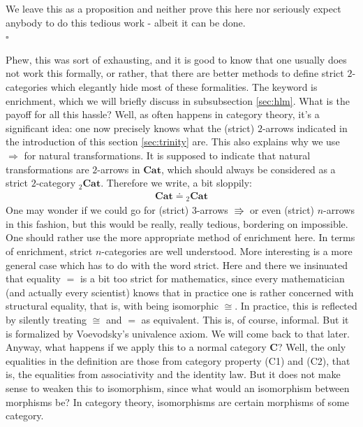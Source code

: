 \begin{prf}
We leave this as a proposition and neither prove this here nor seriously expect anybody to do this tedious work - albeit it can be done.
\\
\phantom{proven}
\hfill
$\square$
\end{prf}
Phew, this was sort of exhausting, and it is good to know that one usually does not work this formally, or rather, that there are better methods to define strict $2$-categories which elegantly hide most of these formalities.
The keyword is {\glqq}enrichment{\grqq}, which we will briefly discuss in subsubsection \ref{sec:hlm}.
What is the payoff for all this hassle?
Well, as often happens in category theory, it's a significant idea: one now precisely knows what the (strict) $2$-arrows indicated in the introduction of this section \ref{sec:trinity} are.
This also explains why we use $\Rightarrow$ for natural transformations.
It is supposed to indicate that natural transformations are $2$-arrows in $\mathbf{Cat}$, which should always be considered as a strict $2$-category ${}_{2}\mathbf{Cat}$.
Therefore we write, a bit sloppily:
\begin{align*}
  \mathbf{Cat}
  \doteq
  {}_{2}\mathbf{Cat}
\end{align*}
One may wonder if we could go for (strict) $3$-arrows $\Rrightarrow$ or even (strict) $n$-arrows in this fashion, but this would be really, really tedious, bordering on impossible.
One should rather use the more appropriate method of enrichment here.
In terms of enrichment, strict $n$-categories are well understood.
More interesting is a more general case which has to do with the word {\glqq}strict{\grqq}.
Here and there we insinuated that equality $=$ is a bit too strict for mathematics, since every mathematician (and actually every scientist) knows that in practice one is rather concerned with structural equality, that is, with being isomorphic $\cong$.
In practice, this is reflected by silently treating $\cong$ and $=$ as equivalent.
This is, of course, informal.
But it is formalized by Voevodsky's {\glqq}univalence axiom{\grqq}.
We will come back to that later.
Anyway, what happens if we apply this to a normal category $\mathbf{C}$?
Well, the only equalities in the definition are those from category property (C1) and (C2), that is, the equalities from associativity and the identity law.
But it does not make sense to weaken this to isomorphism, since what would an isomorphism between morphisms be?
In category theory, isomorphisms are certain morphisms of some category.
